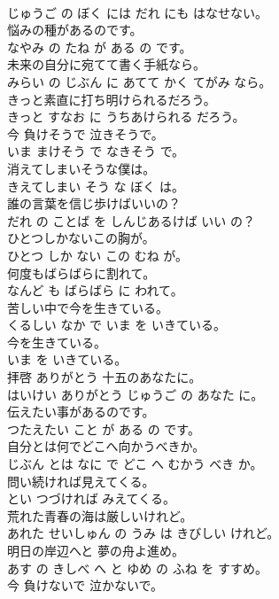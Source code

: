 \documentclass[8pt]{extreport}
\begin{document}
\begin{CJK}{UTF8}{min}
\\	じゅうご の ぼく には だれ にも はなせない。	
\\	悩みの種があるのです。	
\\	なやみ の たね が ある の です。	
\\	未来の自分に宛てて書く手紙なら。	
\\	みらい の じぶん に あてて かく てがみ なら。	
\\	きっと素直に打ち明けられるだろう。	
\\	きっと すなお に うちあけられる だろう。	
\\	今 負けそうで 泣きそうで。	
\\	いま まけそう で なきそう で。	
\\	消えてしまいそうな僕は。	
\\	きえてしまい そう な ぼく は。	
\\	誰の言葉を信じ歩けばいいの？	
\\	だれ の ことば を しんじあるけば いい の？	
\\	ひとつしかないこの胸が。	
\\	ひとつ しか ない この むね が。	
\\	何度もばらばらに割れて。	
\\	なんど も ばらばら に われて。	
\\	苦しい中で今を生きている。	
\\	くるしい なか で いま を いきている。	
\\	今を生きている。	
\\	いま を いきている。	
\\	拝啓 ありがとう 十五のあなたに。	
\\	はいけい ありがとう じゅうご の あなた に。	
\\	伝えたい事があるのです。	
\\	つたえたい こと が ある の です。	
\\	自分とは何でどこへ向かうべきか。	
\\	じぶん とは なに で どこ へ むかう べき か。	
\\	問い続ければ見えてくる。	
\\	とい つづければ みえてくる。	
\\	荒れた青春の海は厳しいけれど。	
\\	あれた せいしゅん の うみ は きびしい けれど。	
\\	明日の岸辺へと 夢の舟よ進め。	
\\	あす の きしべ へ と ゆめ の ふね を すすめ。	
\\	今 負けないで 泣かないで。	

\end{CJK}
\end{document}
